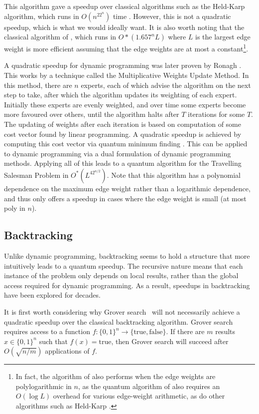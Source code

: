 This algorithm gave a speedup over classical algorithms such as the Held-Karp algorithm, which runs in $O(n^22^n)$ time \cite{held1962}. However, this is not a quadratic speedup, which is what we would ideally want. It is also worth noting that the classical algorithm of \cite{bjorklund14}, which runs in $O*(1.657^nL)$ where $L$ is the largest edge weight is more efficient assuming that the edge weights are at most a constant\footnote{In fact, the algorithm of \cite{bjorklund14} also performs when the edge weights are polylogarithmic in $n$, as the quantum algorithm of \cite{ambainis2018} also requires an $O(\log L)$ overhead for various edge-weight arithmetic, as do other algorithms such as Held-Karp \cite{held1962}.}.

A quadratic speedup for dynamic programming was later proven by Ronagh \cite{ronagh2019}. This works by a technique called the Multiplicative Weights Update Method. In this method, there are $n$ experts, each of which advise the algorithm on the next step to take, after which the algorithm updates its weighting of each expert. Initially these experts are evenly weighted, and over time some experts become more favoured over others, until the algorithm halts after $T$ iterations for some $T$. The updating of weights after each iteration is based on computation of some cost vector found by linear programming. A quadratic speedup is achieved by computing this cost vector via quantum minimum finding \cite{durr1996}. This can be applied to dynamic programming via a dual formulation of dynamic programming methods. Applying all of this leads to a quantum algorithm for the Travelling Salesman Problem in $O^*(L^42^{n/2})$. Note that this algorithm has a polynomial dependence on the maximum edge weight rather than a logarithmic dependence, and thus only offers a speedup in cases where the edge weight is small (at most poly in $n$).

\subsection{Backtracking}
\label{sec:q-backtrack}

Unlike dynamic programming, backtracking seems to hold a structure that more intuitively leads to a quantum speedup. The recursive nature means that each instance of the problem only depends on local results, rather than the global access required for dynamic programming. As a result, speedups in backtracking have been explored for decades.

It is first worth considering why Grover search~\cite{grover96} will not necessarily achieve a quadratic speedup over the classical backtracking algorithm. Grover search requires access to a function $f \colon \{0,1\}^n \rightarrow \{\text{true}, \text{false}\}$. If there are $m$ results $x \in \{0,1\}^n$ such that $f(x) = \text{true}$, then Grover search will succeed after $O(\sqrt{n/m})$ applications of $f$\cite{grover96}.

